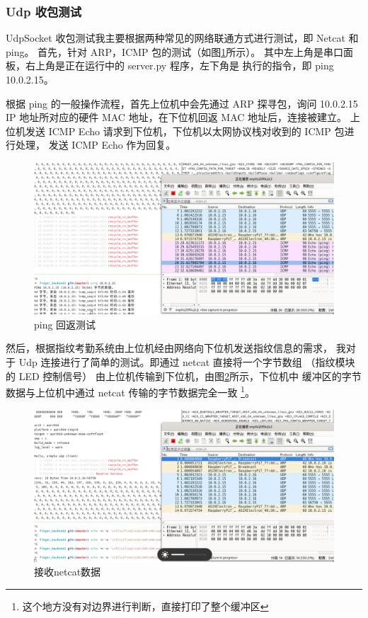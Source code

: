     \subsubsection{Udp 收包测试}

    UdpSocket 收包测试我主要根据两种常见的网络联通方式进行测试，即 Netcat 和 ping。
    首先，针对 ARP，ICMP 包的测试（如图\ref{test::pingICMP回返测试}所示）。
    其中左上角是串口面板，右上角是正在运行中的 server.py 程序，左下角是
    执行的指令，即 ping 10.0.2.15。
    
    根据 ping 的一般操作流程，首先上位机中会先通过 ARP 探寻包，询问 10.0.2.15
    IP 地址所对应的硬件 MAC 地址，在下位机回返 MAC 地址后，连接被建立。
    上位机发送 ICMP Echo 请求到下位机，下位机以太网协议栈对收到的 ICMP 包进行处理，
    发送 ICMP Echo 作为回复。

    \begin{figure}[ht]
        \centering
        \includegraphics[width=\textwidth]{./imgs/测试-pingICMP回返测试.png}
        \caption{ping 回返测试}    \label{test::pingICMP回返测试}
    \end{figure}   

    然后，根据指纹考勤系统由上位机经由网络向下位机发送指纹信息的需求，
    我对于 Udp 连接进行了简单的测试。即通过 netcat 直接将一个字节数组
    （指纹模块的 LED 控制信号）
    由上位机传输到下位机，由图\ref{test::接收netcat数据}所示，下位机中
    缓冲区的字节数据与上位机中通过 netcat 传输的字节数据完全一致
    \footnote{这个地方没有对边界进行判断，直接打印了整个缓冲区}。

    \begin{figure}[H]
        \centering
        \includegraphics[width=\textwidth]{./imgs/测试-接收netcat数据.png}
        \caption{接收netcat数据}    \label{test::接收netcat数据}
    \end{figure}   

